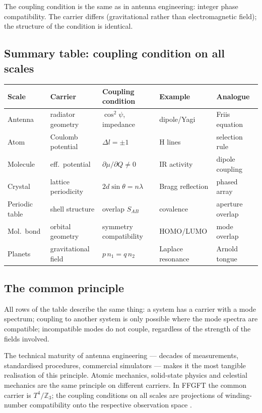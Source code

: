 The coupling condition is the same as in antenna engineering: integer phase
compatibility. The carrier differs (gravitational rather than electromagnetic
field); the structure of the condition is identical.

\subsection*{Summary table: coupling condition on all scales}

\begin{center}
\begin{tabular}{@{}lllll@{}}
\toprule
\textbf{Scale} & \textbf{Carrier} & \textbf{Coupling condition}
  & \textbf{Example} & \textbf{Analogue} \\
\midrule
Antenna & radiator geometry & $\cos^2\psi$, impedance
  & dipole/Yagi & Friis equation \\
Atom & Coulomb potential & $\Delta l=\pm1$
  & H lines & selection rule \\
Molecule & eff.\ potential & $\partial\mu/\partial Q \neq 0$
  & IR activity & dipole coupling \\
Crystal & lattice periodicity & $2d\sin\theta=n\lambda$
  & Bragg reflection & phased array \\
Periodic table & shell structure & overlap $S_{AB}$
  & covalence & aperture overlap \\
Mol.\ bond & orbital geometry & symmetry compatibility
  & HOMO/LUMO & mode overlap \\
Planets & gravitational field & $p\,n_1 = q\,n_2$
  & Laplace resonance & Arnold tongue \\
\bottomrule
\end{tabular}
\end{center}

\subsection*{The common principle}

All rows of the table describe the same thing: a system has a carrier with
a mode spectrum; coupling to another system is only possible where the mode
spectra are compatible; incompatible modes do not couple, regardless of the
strength of the fields involved.

The technical maturity of antenna engineering --- decades of measurements,
standardised procedures, commercial simulators --- makes it the most
tangible realisation of this principle. Atomic mechanics, solid-state
physics and celestial mechanics are the same principle on different carriers.
In FFGFT the common carrier is $T^4/\mathbb{Z}_3$; the coupling conditions
on all scales are projections of winding-number compatibility onto the
respective observation space \SM.

